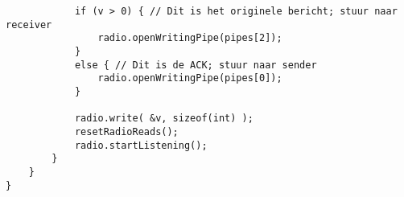 \begin{lstlisting}
            if (v > 0) { // Dit is het originele bericht; stuur naar receiver
                radio.openWritingPipe(pipes[2]);
            }
            else { // Dit is de ACK; stuur naar sender
                radio.openWritingPipe(pipes[0]);
            }

            radio.write( &v, sizeof(int) );
            resetRadioReads();
            radio.startListening();
        }
    }
}
\end{lstlisting}